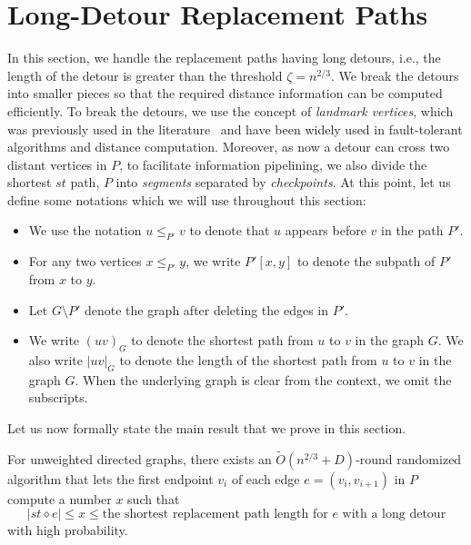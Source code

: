 \section{Long-Detour Replacement Paths}
\label{sec:long}

In this section, we handle the replacement paths having long detours, i.e., the length of the detour is greater than the threshold $\zeta = n^{2/3}$. We break the detours into smaller pieces so that the required distance information can be computed efficiently. To break the detours, we use the concept of \emph{landmark vertices}, which was previously used in the literature~\cite{BernsteinK08, ullman1990high} and have been widely used in fault-tolerant algorithms and distance computation. Moreover, as now a detour can cross two distant vertices in $P$, to facilitate information pipelining, we also divide the shortest $st$ path, $P$ into \emph{segments} separated by \emph{checkpoints}. At this point, let us define some notations which we will use throughout this section: 
\begin{itemize}
    \item We use the notation $u \leq_{P'} v$ to denote that $u$ appears before $v$ in the path $P'$.
    \item For any two vertices $x \leq_{P'} y$,  we write $P'[x,y]$ to denote the subpath of $P'$ from $x$ to $y$.
    \item Let $G \setminus P'$ denote the graph after deleting the edges in $P'$. 
    \item We write $(uv)_G$ to denote the shortest path from $u$ to $v$ in the graph $G$. We also write $|uv|_G$ to denote the length of the shortest path from $u$ to $v$ in the graph $G$. When the underlying graph is clear from the context, we omit the subscripts.
\end{itemize}

Let us now formally state the main result that we prove in this section. %

\begin{proposition}
\label{Thm: Long Detour Part Works}
    For unweighted directed graphs, there exists an $\widetilde{O}(n^{2/3}+D)$-round randomized algorithm that lets the first endpoint $v_i$ of each edge $e=(v_i, v_{i+1})$ in $P$ compute a number $x$ such that
    \[|st \diamond e| \leq x \leq \text{the shortest replacement path length for $e$ with a long detour}\] with high probability.   
\end{proposition}


